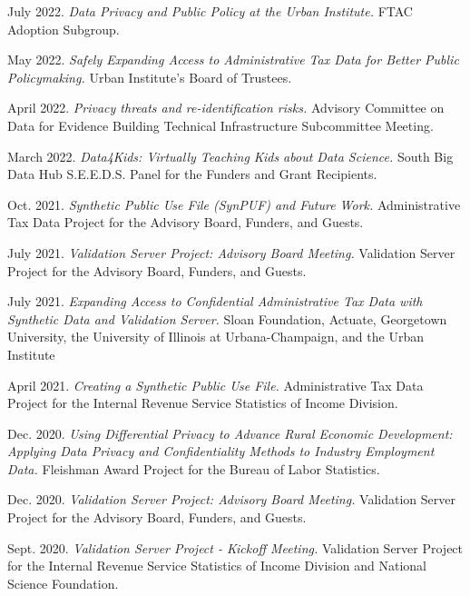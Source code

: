 \begin{etaremune}[topsep=0pt, itemsep=4pt, partopsep=0pt, parsep=0pt]
    \item July 2022. \textit{Data Privacy and Public Policy at the Urban Institute.} FTAC Adoption Subgroup.
    
    \item May 2022. \textit{Safely Expanding Access to Administrative Tax Data for Better Public Policymaking.} Urban Institute's Board of Trustees.
    
    \item April 2022. \textit{Privacy threats and re-identification risks.} Advisory Committee on Data for Evidence Building Technical Infrastructure Subcommittee Meeting.
    
    \item March 2022. \textit{Data4Kids: Virtually Teaching Kids about Data Science.} South Big Data Hub S.E.E.D.S. Panel for the Funders and Grant Recipients.
    
    \item Oct. 2021. \textit{Synthetic Public Use File (SynPUF) and Future Work.} Administrative Tax Data Project for the Advisory Board, Funders, and Guests.
    
    \item July 2021. \textit{Validation Server Project: Advisory Board Meeting.} Validation Server Project for the Advisory Board, Funders, and Guests.
    
    \item July 2021. \textit{Expanding Access to Confidential Administrative Tax Data with Synthetic Data and Validation Server.} Sloan Foundation, Actuate, Georgetown University, the University of Illinois at Urbana-Champaign, and the Urban Institute
    
    \item April 2021. \textit{Creating a Synthetic Public Use File.} Administrative Tax Data Project for the Internal Revenue Service Statistics of Income Division.

    \item Dec. 2020. \textit{Using Differential Privacy to Advance Rural Economic Development: Applying Data Privacy and Confidentiality Methods to Industry Employment Data.} Fleishman Award Project for the Bureau of Labor Statistics.
    
    \item Dec. 2020. \textit{Validation Server Project: Advisory Board Meeting.} Validation Server Project for the Advisory Board, Funders, and Guests.
    
    \item Sept. 2020. \textit{Validation Server Project - Kickoff Meeting.} Validation Server Project for the Internal Revenue Service Statistics of Income Division and National Science Foundation.
    

\end{etaremune}
